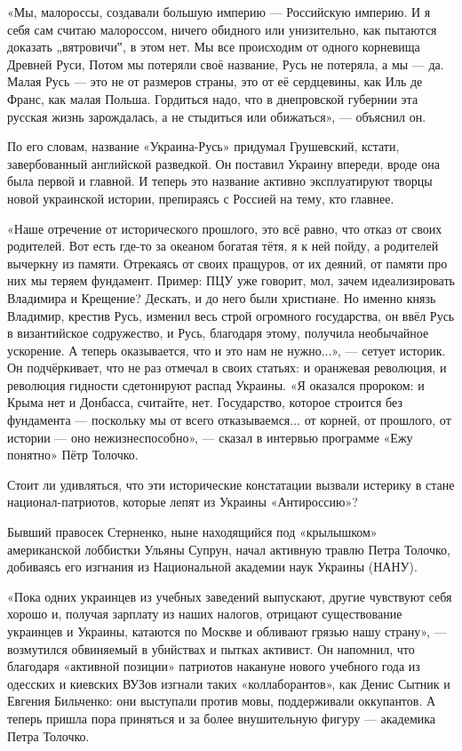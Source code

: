«Мы, малороссы, создавали большую империю — Российскую империю. И я себя сам
считаю малороссом, ничего обидного или унизительно, как пытаются доказать
„вятровичи‟, в этом нет. Мы все происходим от одного корневища Древней Руси,
Потом мы потеряли своё название, Русь не потеряла, а мы — да. Малая Русь — это
не от размеров страны, это от её сердцевины, как Иль де Франс, как малая
Польша. Гордиться надо, что в днепровской губернии эта русская жизнь
зарождалась, а не стыдиться или обижаться», — объяснил он.

По его словам, название «Украина-Русь» придумал Грушевский, кстати,
завербованный английской разведкой. Он поставил Украину впереди, вроде она была
первой и главной. И теперь это название активно эксплуатируют творцы новой
украинской истории, препираясь с Россией на тему, кто главнее.

«Наше отречение от исторического прошлого, это всё равно, что отказ от своих
родителей. Вот есть где-то за океаном богатая тётя, я к ней пойду, а родителей
вычеркну из памяти. Отрекаясь от своих пращуров, от их деяний, от памяти про
них мы теряем фундамент. Пример: ПЦУ уже говорит, мол, зачем идеализировать
Владимира и Крещение? Дескать, и до него были христиане. Но именно князь
Владимир, крестив Русь, изменил весь строй огромного государства, он ввёл Русь
в византийское содружество, и Русь, благодаря этому, получила необычайное
ускорение. А теперь оказывается, что и это нам не нужно...», — сетует историк.
Он подчёркивает, что не раз отмечал в своих статьях: и оранжевая революция, и
революция гидности сдетонируют распад Украины. «Я оказался пророком: и Крыма
нет и Донбасса, считайте, нет. Государство, которое строится без фундамента —
поскольку мы от всего отказываемся... от корней, от прошлого, от истории — оно
нежизнеспособно», — сказал в интервью программе «Ежу понятно» Пётр Толочко.

Стоит ли удивляться, что эти исторические констатации вызвали истерику в стане
национал-патриотов, которые лепят из Украины «Антироссию»?

Бывший правосек Стерненко, ныне находящийся под «крылышком» американской
лоббистки Ульяны Супрун, начал активную травлю Петра Толочко, добиваясь его
изгнания из Национальной академии наук Украины (НАНУ).

«Пока одних украинцев из учебных заведений выпускают, другие чувствуют себя
хорошо и, получая зарплату из наших налогов, отрицают существование украинцев и
Украины, катаются по Москве и обливают грязью нашу страну», — возмутился
обвиняемый в убийствах и пытках активист. Он напомнил, что благодаря «активной
позиции» патриотов накануне нового учебного года из одесских и киевских ВУЗов
изгнали таких «коллаборантов», как Денис Сытник и Евгения Бильченко: они
выступали против мовы, поддерживали оккупантов. А теперь пришла пора приняться
и за более внушительную фигуру — академика Петра Толочко.

